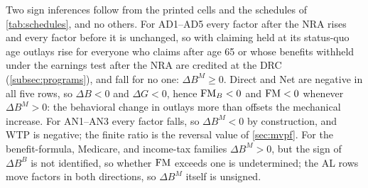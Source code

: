 Two sign inferences follow from the printed cells and the schedules of \autoref{tab:schedules}, and no others. For AD1--AD5 every factor after the NRA rises and every factor before it is unchanged, so with claiming held at its status-quo age outlays rise for everyone who claims after age 65 or whose benefits withheld under the earnings test after the NRA are credited at the DRC (\autoref{subsec:programs}), and fall for no one: $\Delta B^{M}\ge0$.
Direct and Net are negative in all five rows, so $\Delta B<0$ and $\Delta G<0$, hence $\operatorname{FM}_B<0$ and $\operatorname{FM}<0$ whenever $\Delta B^{M}>0$: the behavioral change in outlays more than offsets the mechanical increase.
For AN1--AN3 every factor falls, so $\Delta B^{M}<0$ by construction, and WTP is negative; the finite ratio is the reversal value of \autoref{sec:mvpf}.
For the benefit-formula, Medicare, and income-tax families $\Delta B^{M}>0$, but the sign of $\Delta B^{B}$ is not identified, so whether $\operatorname{FM}$ exceeds one is undetermined; the AL rows move factors in both directions, so $\Delta B^{M}$ itself is unsigned.
